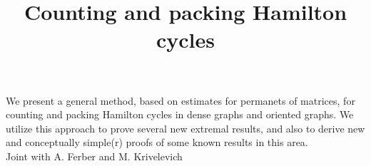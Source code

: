 \title{Counting and packing Hamilton cycles}
\endtitle
We present a general method, based on estimates for permanets of matrices, for counting and packing Hamilton cycles in dense graphs and oriented graphs. We utilize this approach to prove several new extremal results, and also to derive new and  conceptually simple(r) proofs of some known results in this area.\\
Joint with A. Ferber and M. Krivelevich
